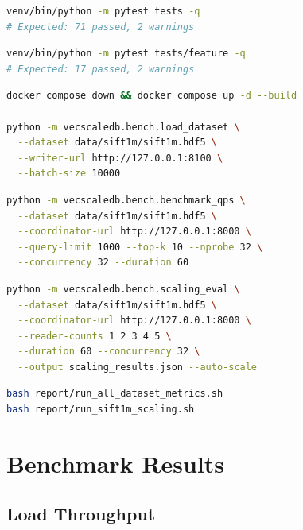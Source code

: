 \documentclass[11pt,a4paper]{article}
\begin{document}
\begin{lstlisting}[language=bash, caption={Run full automated test suite.}]
venv/bin/python -m pytest tests -q
# Expected: 71 passed, 2 warnings
\end{lstlisting}

\begin{lstlisting}[language=bash, caption={Run proposal feature suite only.}]
venv/bin/python -m pytest tests/feature -q
# Expected: 17 passed, 2 warnings
\end{lstlisting}

\begin{lstlisting}[language=bash, caption={Load SIFT1M into a live distributed cluster.}]
docker compose down && docker compose up -d --build

python -m vecscaledb.bench.load_dataset \
  --dataset data/sift1m/sift1m.hdf5 \
  --writer-url http://127.0.0.1:8100 \
  --batch-size 10000
\end{lstlisting}

\begin{lstlisting}[language=bash, caption={Run QPS benchmark (60 s, 32 concurrent workers).}]
python -m vecscaledb.bench.benchmark_qps \
  --dataset data/sift1m/sift1m.hdf5 \
  --coordinator-url http://127.0.0.1:8000 \
  --query-limit 1000 --top-k 10 --nprobe 32 \
  --concurrency 32 --duration 60
\end{lstlisting}

\begin{lstlisting}[language=bash, caption={Reader scaling sweep (1–5 readers, auto-scale).}]
python -m vecscaledb.bench.scaling_eval \
  --dataset data/sift1m/sift1m.hdf5 \
  --coordinator-url http://127.0.0.1:8000 \
  --reader-counts 1 2 3 4 5 \
  --duration 60 --concurrency 32 \
  --output scaling_results.json --auto-scale
\end{lstlisting}

\begin{lstlisting}[language=bash, caption={Generate all benchmark metrics and compile report.}]
bash report/run_all_dataset_metrics.sh
bash report/run_sift1m_scaling.sh
\end{lstlisting}

\section{Benchmark Results}

\subsection{Load Throughput}
\end{document}

